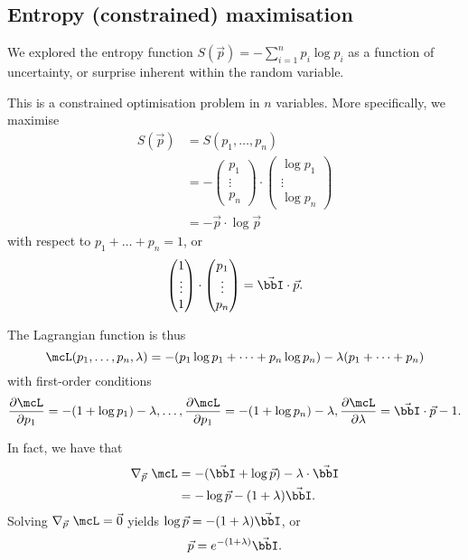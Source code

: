 \documentclass[a4paper, 12pt,oneside,openany]{book}
\begin{document}
\subsection{Entropy (constrained) maximisation}

We explored the entropy function $S(\vec{p})= - \sum\limits_{i=1}^n  p_i \log{p_i}$ as a function of uncertainty, or surprise inherent within the random variable.

This is a constrained optimisation problem in $n$ variables. More specifically, we maximise \begin{align*} S(\vec{p}) &= S(p_1, \dots, p_n) \\ &= -\begin{pmatrix} p_1 \\ \vdots \\ p_n \end{pmatrix} \cdot \begin{pmatrix} \log p_1 \\ \vdots \\ \log p_n \end{pmatrix} \\ &= -\vec{p} \cdot \log{\vec{p}} \end{align*} with respect to $p_1+\dots+p_n=1$, or $$\begin{pmatrix} 1 \\ \vdots \\ 1 \end{pmatrix} \cdot \begin{pmatrix} p_1 \\ \vdots \\ p_n \end{pmatrix} = \vec{\bbI} \cdot \vec{p}.$$

The Lagrangian function is thus $$ \mcL(p_1, \dots, p_n, \lambda) = -(p_1 \log p_1+ \dots + p_n \log p_n) - \lambda(p_1+\dots+p_n) $$ with first-order conditions $$\frac{\partial \mcL}{\partial p_1}= -(1 + \log p_1) - \lambda, \dots, \frac{\partial \mcL}{\partial p_1}= -(1 + \log p_n) - \lambda, \frac{\partial \mcL}{\partial \lambda} = \vec{\bbI} \cdot \vec{p}-1.$$ 

In fact, we have that \begin{align*} \nabla_{\vec{p}}\ \mcL &= -(\vec{\bbI} +\log \vec{p}) - \lambda \cdot \vec{\bbI} \\ &= -\log \vec{p} - (1+\lambda) \vec{\bbI}. \end{align*} Solving $\nabla_{\vec{p}}\ \mcL=\vec{0}$ yields $\log \vec{p}  =-(1+\lambda) \vec{\bbI}$, or $$\vec{p} = e^{-(1+\lambda)} \vec{\bbI}.$$
\end{document}
